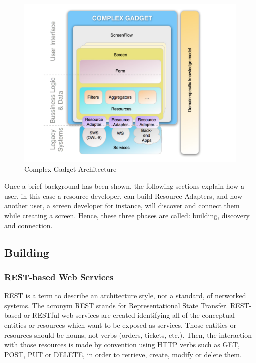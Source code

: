 \documentclass{fast_latex}
\begin{document}
\begin{figure}
  \begin{center}
    \includegraphics[width=\linewidth]{images/ComplexGadgetArchitecture.pdf}
    \caption{Complex Gadget Architecture}
    \label{fig:complex_gadget_architecture}
  \end{center}
\end{figure}

Once a brief background has been shown, the following sections explain how a user, in this case a resource developer, can build Resource Adapters, and how another user, a screen developer for instance, will discover and connect them while creating a screen. Hence, these three phases are called: building, discovery and connection.

\subsection{Building} %
\label{sub:building}

\subsubsection{REST-based Web Services} %
\label{ssub:rest_based_web_services}

REST is a term to describe an architecture style, not a standard, of networked systems. The acronym REST stands for Representational State Transfer. REST-based or RESTful web services \cite{Fielding2000} are created identifying all of the conceptual entities or resources which want to be exposed as services. Those entities or resources should be nouns, not verbs (orders, tickets, etc.). Then, the interaction with those resources is made by convention using HTTP verbs such as GET, POST, PUT or DELETE, in order to retrieve, create, modify or delete them.
\end{document}
